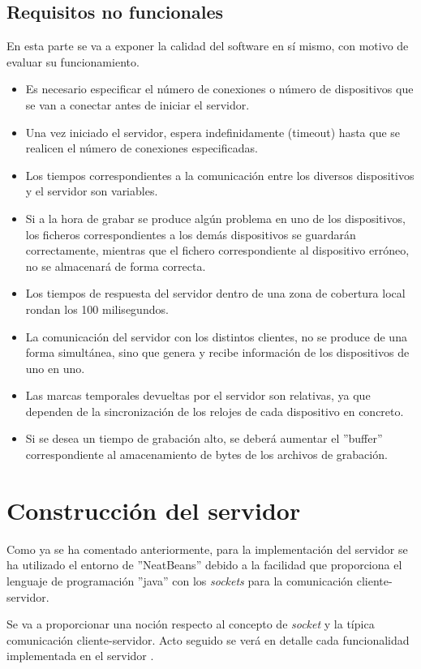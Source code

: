 \documentclass[a4paper,11pt]{book}
\begin{document}
			\subsection{Requisitos no funcionales}
			En esta parte se va a exponer la calidad del software en sí mismo, con motivo de evaluar su funcionamiento.
			\begin{itemize}
			\item Es necesario especificar el número de conexiones o número de dispositivos que se van a conectar antes de iniciar el servidor.
			\item Una vez iniciado el servidor, espera indefinidamente (timeout) hasta que se realicen el número de conexiones especificadas.
			\item Los tiempos correspondientes a la comunicación entre los diversos dispositivos y el servidor son variables.
			\item Si a la hora de grabar se produce algún problema en uno de los dispositivos, los ficheros correspondientes a los demás dispositivos se guardarán correctamente, mientras que el fichero correspondiente al dispositivo erróneo, no se almacenará de forma correcta.
			\item Los tiempos de respuesta del servidor dentro de una zona de cobertura local rondan los 100 milisegundos.
			\item La comunicación del servidor con los distintos clientes, no se produce de una forma simultánea, sino que genera y recibe información de los dispositivos de uno en uno.
			\item Las marcas temporales devueltas por el servidor son relativas, ya que dependen de la sincronización de los relojes de cada dispositivo en concreto.
			\item Si se desea un tiempo de grabación alto, se deberá aumentar el ''buffer'' correspondiente al amacenamiento de bytes de los archivos de grabación.
			\end{itemize}
		
		\section{Construcción del servidor}
		
			Como ya se ha comentado anteriormente, para la implementación del servidor se ha utilizado el entorno de ''NeatBeans'' debido a la facilidad que proporciona el lenguaje de programación ''java'' con los \textit{sockets} para la comunicación cliente-servidor.
			
			Se va a proporcionar una noción respecto al concepto de \textit{socket} y la típica comunicación cliente-servidor. Acto seguido se verá en detalle cada funcionalidad implementada en el servidor	.
			
\end{document}
